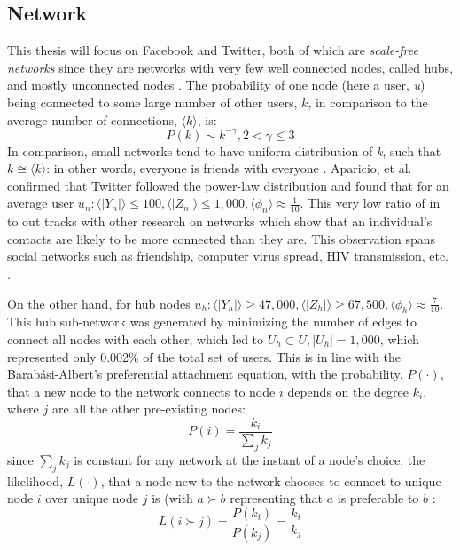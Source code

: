 \documentclass[NETN,manuscript]{stjour-new}
\begin{document}
\subsection{Network}
\label{scalefreenetwork}
This thesis will focus on Facebook and Twitter, both of which are \textit{scale-free networks} \citep{aparicio2015model,broido2019scale,barabasi2000scale} since they are networks with very few well connected nodes, called hubs, and mostly unconnected nodes \citep{barabasi2009scale,barabasi1999emergence,dorogovtsev2002evolution}. The probability of one node (here a user, \textit{u}) being connected to some large number of other users, $k$, in comparison to the average number of connections, $\langle k \rangle$, is: 
\begin{equation}
\label{powerlaw}
    P(k) \sim k^{-\gamma}, 2 < \gamma \leq 3
\end{equation}
In comparison, small networks tend to have uniform distribution of \textit{k}, such that $k \cong \langle k \rangle$: in other words, everyone is friends with everyone \citep{erdHos1960evolution,watts1998collective}. Aparicio, et al. confirmed that Twitter followed the power-law distribution and found that for an average user $u_n:\langle | Y_n| \rangle \leq 100, \langle | Z_n| \rangle \leq 1,000, \langle  \phi_n \rangle \approx \frac{1}{10}$. This very low ratio of in to out tracks with other research on networks which show that an individual's contacts are likely to be more connected than they are. This observation spans social networks such as friendship, computer virus spread, HIV transmission, etc. \citep{feld1991your,newman2003ego,pastor2001epidemic,pastor2002epidemic,pastor2015epidemic,helleringer2007sexual}.

On the other hand, for hub nodes $u_h: \langle | Y_h| \rangle \geq 47,000, \langle | Z_h| \rangle \geq 67,500, \langle  \phi_h \rangle \approx \frac{7}{10}$. This hub sub-network was generated by minimizing the number of edges to connect all nodes with each other, which led to $U_h \subset U, |U_h| = 1,000$, which represented only 0.002\% of the total set of users. This is in line with the Barab{\'a}si-Albert's preferential attachment equation, with the probability, $P(\cdot)$, that a new node to the network connects to node $i$ depends on the degree $k_i$, where $j$ are all the other pre-existing nodes:
\begin{equation}
\label{preferentialequation}
    P(i)=\frac{k_i}{\sum_{j} k_j}
\end{equation}
since $\sum_{j} k_j$ is constant for any network at the instant of a node's choice, the likelihood, $L(\cdot)$, that a node new to the network chooses to connect to unique node $i$ over unique node $j$ is (with $a \succ b$ representing that $a$ is preferable to $b$ :
\begin{equation}
\label{reducedpreferentialequation}
    L(i \succ j)=\frac{P(k_i)}{P(k_j)} = \frac{k_i}{k_j}
\end{equation}
\end{document}
